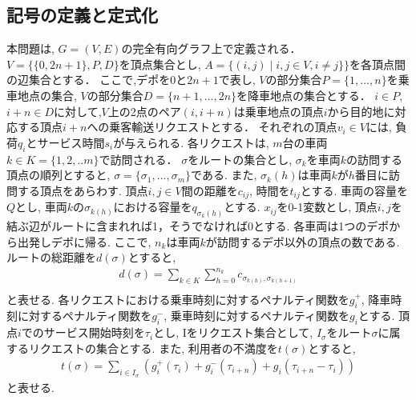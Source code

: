 \documentclass[a4j,11pt,twocolumn]{jsarticle}
\begin{document}
\subsection{{\large 記号の定義と定式化}}
本問題は, $G = (V, E)$の完全有向グラフ上で定義される．$V =\{\{0,2n+1\},P,D\}$を頂点集合とし, $A = \{(i,j) \mid i,j\in V ,i \neq j\}\}$を各頂点間の辺集合とする．
ここで,デポを$0$と$2n+1$で表し, $V$の部分集合$P =\{1,...,n \}$を乗車地点の集合, $V$の部分集合$D =\{n+1,...,2n \}$を降車地点の集合とする．
$i \in P$, $i+n \in D$に対して,$V$上の2点のペア$(i,i+n)$は乗車地点の頂点$i$から目的地に対応する頂点$i+n$への乗客輸送リクエストとする．
それぞれの頂点$v_i \in V$には, 負荷$q_i$とサービス時間$s_i$が与えられる.
各リクエストは, $m$台の車両$k \in K = \{1,2,..m\}$で訪問される．
$\sigma$をルートの集合とし, $\sigma_k$を車両$k$の訪問する頂点の順列とすると, $\sigma = \{\sigma_1,...,\sigma_m\}$である. また, $\sigma_k(h)$は車両$k$が$h$番目に訪問する頂点をあらわす.
頂点$i,j \in V$間の距離を$c_{ij}$, 時間を$t_{ij}$とする.
車両の容量を$Q$とし, 車両$k$の$\sigma _{k(h)}$における容量を$q_{\sigma_k(h)}$とする.
$x_{ij}$を0-1変数とし, 頂点$i,j$を結ぶ辺がルートに含まれれば1，そうでなければ0とする.
各車両は1つのデポから出発しデポに帰る. ここで, $n_k$は車両$k$が訪問するデポ以外の頂点の数である.
ルートの総距離を$d(\sigma)$とすると,
\begin{align*}
d(\sigma) = \sum_ {k\in K} \sum_{h=0}^{n_k} c_ {\sigma_{k(h)},\sigma_ {k(h+1)} }\\
\end{align*}
と表せる.
各リクエストにおける乗車時刻に対するペナルティ関数を$g^+_i$, 降車時刻に対するペナルティ関数を$g^-_i$, 乗車時刻に対するペナルティ関数を$g_i$とする.
頂点$i$でのサービス開始時刻を$\tau_i$とし, Iをリクエスト集合として, $I_\sigma$をルート$\sigma$に属するリクエストの集合とする.
また, 利用者の不満度を$t(\sigma)$とすると,
\begin{align*}
t(\sigma) = \sum_ {i \in I_\sigma} (g^+_i(\tau_i)+g^-_i(\tau_{i+n})+g_i(\tau_{i+n}-\tau_i))
\end{align*}
と表せる.
\end{document}
